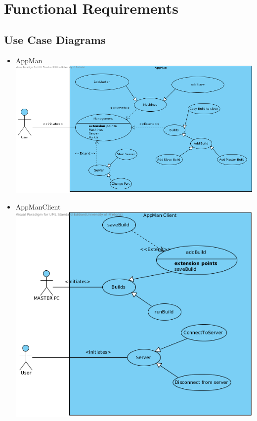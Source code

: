 \documentclass[a4paper,12pt,final]{article}
\begin{document}
\section{Functional Requirements}
\subsection{Use Case Diagrams}
\begin{itemize}
\item AppMan\\
\includegraphics[scale=0.5]{UseCaseDiagram.png} 
\item AppManClient\\
\includegraphics[scale=0.6]{UseCaseDiagramClient.png} 
\end{itemize}
\end{document}
